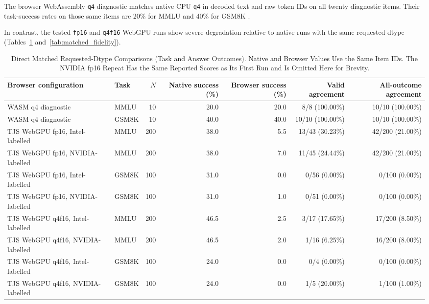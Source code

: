 \documentclass[conference]{IEEEtran}
\newcommand{\fphalf}{\texttt{fp16}}
\newcommand{\qfour}{\texttt{q4}}
\newcommand{\qfourhalf}{\texttt{q4f16}}
\begin{document}
The browser WebAssembly \qfour{} diagnostic matches native
CPU \qfour{} in decoded text and raw token IDs on all twenty
diagnostic items. Their task-success rates on those same
items are 20\% for MMLU and 40\% for GSM8K
\cite{repository}.

In contrast, the tested \fphalf{} and \qfourhalf{} WebGPU
runs show severe degradation relative to native runs with
the same requested dtype (Tables~\ref{tab:matched_outcomes}
and~\ref{tab:matched_fidelity}).

\begin{table}[t]
\caption{
Direct Matched Requested-Dtype Comparisons (Task and Answer Outcomes).
Native and Browser Values Use the Same Item IDs.
The NVIDIA fp16 Repeat Has the Same Reported Scores as Its
First Run and Is Omitted Here for Brevity.
}
\label{tab:matched_outcomes}
\centering
\footnotesize
\setlength{\tabcolsep}{6pt}
\begin{tabular}{@{}llrrrrr@{}}
\toprule
Browser configuration & Task & $N$ & Native success (\%) & Browser success (\%) & Valid agreement & All-outcome agreement\\
\midrule
WASM q4 diagnostic & MMLU & 10 & 20.0 & 20.0 & 8/8 (100.00\%) & 10/10 (100.00\%)\\
WASM q4 diagnostic & GSM8K & 10 & 40.0 & 40.0 & 10/10 (100.00\%) & 10/10 (100.00\%)\\
\midrule
TJS WebGPU fp16, Intel-labelled & MMLU & 200 & 38.0 & 5.5 & 13/43 (30.23\%) & 42/200 (21.00\%)\\
TJS WebGPU fp16, NVIDIA-labelled & MMLU & 200 & 38.0 & 7.0 & 11/45 (24.44\%) & 42/200 (21.00\%)\\
TJS WebGPU fp16, Intel-labelled & GSM8K & 100 & 31.0 & 0.0 & 0/56 (0.00\%) & 0/100 (0.00\%)\\
TJS WebGPU fp16, NVIDIA-labelled & GSM8K & 100 & 31.0 & 1.0 & 0/51 (0.00\%) & 0/100 (0.00\%)\\
\midrule
TJS WebGPU q4f16, Intel-labelled & MMLU & 200 & 46.5 & 2.5 & 3/17 (17.65\%) & 17/200 (8.50\%)\\
TJS WebGPU q4f16, NVIDIA-labelled & MMLU & 200 & 46.5 & 2.0 & 1/16 (6.25\%) & 16/200 (8.00\%)\\
TJS WebGPU q4f16, Intel-labelled & GSM8K & 100 & 24.0 & 0.0 & 0/4 (0.00\%) & 0/100 (0.00\%)\\
TJS WebGPU q4f16, NVIDIA-labelled & GSM8K & 100 & 24.0 & 0.0 & 1/5 (20.00\%) & 1/100 (1.00\%)\\
\bottomrule
\end{tabular}
\end{table}
\end{document}
